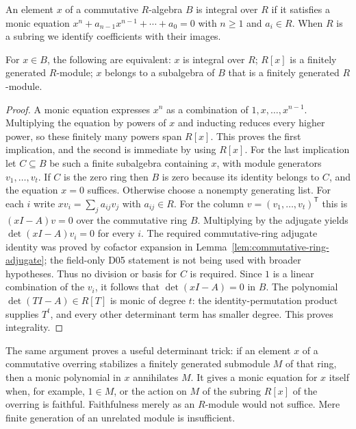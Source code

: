 An element $x$ of a commutative $R$-algebra $B$ is integral over $R$ if
it satisfies a monic equation
$x^n+a_{n-1}x^{n-1}+\cdots+a_0=0$ with $n\ge1$ and $a_i\in R$.
When $R$ is a subring we identify coefficients with their images.
\begin{theorem}\label{thm:integral-finite}
For $x\in B$, the following are equivalent:
$x$ is integral over $R$; $R[x]$ is a finitely generated $R$-module;
$x$ belongs to a subalgebra of $B$ that is a finitely generated
$R$-module.
\end{theorem}
\begin{proof}
A monic equation expresses $x^n$ as a combination of
$1,x,\ldots,x^{n-1}$. Multiplying the equation by powers of $x$ and
inducting reduces every higher power, so these finitely many powers
span $R[x]$. This proves the first implication, and the second is
immediate by using $R[x]$.
For the last implication let $C\subseteq B$ be such a finite subalgebra
containing $x$, with module generators $v_1,\ldots,v_t$.
If $C$ is the zero ring then $B$ is zero because its identity belongs
to $C$, and the equation $x=0$ suffices.
Otherwise choose a nonempty generating list.
For each $i$ write $xv_i=\sum_j a_{ij}v_j$ with $a_{ij}\in R$.
For the column $v=(v_1,\ldots,v_t)^{\mathsf T}$ this is
$(xI-A)v=0$ over the commutative ring $B$.
Multiplying by the adjugate yields
$\det(xI-A)v_i=0$ for every $i$. The required commutative-ring
adjugate identity was proved by cofactor expansion in
Lemma~\ref{lem:commutative-ring-adjugate}; the field-only D05 statement
is not being used with broader hypotheses. Thus no division or
basis for $C$ is required. Since $1$ is a linear combination of the
$v_i$, it follows that $\det(xI-A)=0$ in $B$.
The polynomial $\det(TI-A)\in R[T]$ is monic of degree $t$:
the identity-permutation product supplies $T^t$, and every other
determinant term has smaller degree. This proves integrality.
\end{proof}
The same argument proves a useful determinant trick: if an element
$x$ of a commutative overring stabilizes a finitely generated submodule
$M$ of that ring, then a monic polynomial in $x$ annihilates $M$.
It gives a monic equation for $x$ itself when, for example, $1\in M$,
or the action on $M$ of the subring $R[x]$ of the overring is faithful.
Faithfulness merely as an $R$-module would not suffice.
Mere finite generation of an
unrelated module is insufficient.

